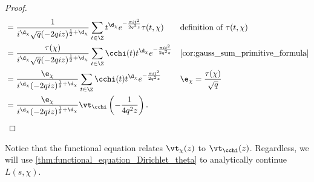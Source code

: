 \begin{proof}
\begin{align*}
          &= \frac{1}{i^{\d_{\chi}}\sqrt{q}(-2qiz)^{\frac{1}{2}+\d_{\chi}}}\sum_{t \in \Z}t^{\d_{\chi}}e^{-\frac{\pi it^{2}}{2q^{2}z}}\tau(t,\chi) && \text{definition of $\tau(t,\chi)$} \\
          &= \frac{\tau(\chi)}{i^{\d_{\chi}}\sqrt{q}(-2qiz)^{\frac{1}{2}+\d_{\chi}}}\sum_{t \in \Z}\cchi(t)t^{\d_{\chi}}e^{-\frac{\pi it^{2}}{2q^{2}z}} && \text{\cref{cor:gauss_sum_primitive_formula}} \\
          &= \frac{\e_{\chi}}{i^{\d_{\chi}}(-2qiz)^{\frac{1}{2}+\d_{\chi}}}\sum_{t \in \Z}\cchi(t)t^{\d_{\chi}}e^{-\frac{\pi it^{2}}{2q^{2}z}} && \text{$\e_{\chi} = \frac{\tau(\chi)}{\sqrt{q}}$} \\
          &=  \frac{\e_{\chi}}{i^{\d_{\chi}}(-2qiz)^{\frac{1}{2}+\d_{\chi}}}\vt_{\cchi}\left(-\frac{1}{4q^{2}z}\right).
        \end{align*}
      \end{proof}

      Notice that the functional equation relates $\vt_{\chi}(z)$ to $\vt_{\cchi}(z)$. Regardless, we will use \cref{thm:functional_equation_Dirichlet_theta} to analytically continue $L(s,\chi)$.
